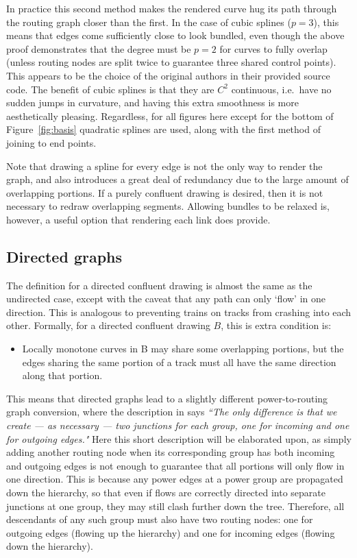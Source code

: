 In practice this second method makes the rendered curve hug its path through the routing graph closer than the first. In the case of cubic splines ($p=3$), this means that edges come sufficiently close to look bundled, even though the above proof demonstrates that the degree must be $p=2$ for curves to fully overlap (unless routing nodes are split twice to guarantee three shared control points).
This appears to be the choice of the original authors \cite{Bach2017} in their provided source code.
The benefit of cubic splines is that they are $C^2$ continuous, i.e.\  have no sudden jumps in curvature, and having this extra smoothness is more aesthetically pleasing. Regardless, for all figures here except for the bottom of Figure~\ref{fig:basis} quadratic splines are used, along with the first method of joining to end points.

Note that drawing a spline for every edge is not the only way to render the graph, and also introduces a great deal of redundancy due to the large amount of overlapping portions. If a purely confluent drawing is desired, then it is not necessary to redraw overlapping segments.
Allowing bundles to be relaxed \cite[Fig.~18]{Bach2017} is, however, a useful option that rendering each link does provide.

\subsection{Directed graphs}
\label{sec:power_directed}
The definition for a directed confluent drawing is almost the same as the undirected case, except with the caveat that any path can only `flow' in one direction. This is analogous to preventing trains on tracks from crashing into each other. 
Formally, for a directed confluent drawing $B$, this is extra condition \cite{Dickerson2005} is:
\begin{mdframed}[backgroundcolor=WhiteSmoke]
\begin{itemize}[leftmargin=*]
  \item Locally monotone curves in B may share some overlapping portions, but the edges sharing the same portion of a track must all have the same direction along that portion.
\end{itemize}
\end{mdframed}
This means that directed graphs lead to a slightly different power-to-routing graph conversion, where the description in \cite{Bach2017} says \emph{``The only difference is that we create --- as necessary --- two junctions for each group, one for incoming and one for outgoing edges."}
Here this short description will be elaborated upon, as simply adding another routing node when its corresponding group has both incoming and outgoing edges is not enough to guarantee that all portions will only flow in one direction.
This is because any power edges at a power group are propagated down the hierarchy, so that even if flows are correctly directed into separate junctions at one group, they may still clash further down the tree.
Therefore, all descendants of any such group must also have two routing nodes: one for outgoing edges (flowing up the hierarchy) and one for incoming edges (flowing down the hierarchy).


